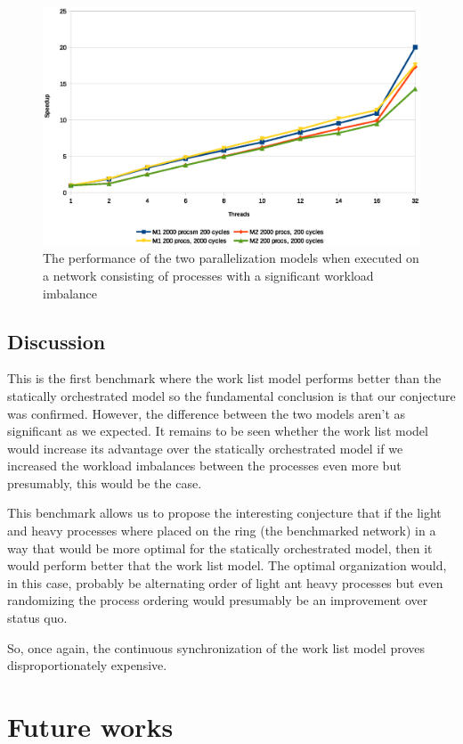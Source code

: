 \begin{figure}
\centering
\includegraphics[width=\textwidth]{graphs/uneven}
\caption[Benchmark of uneven workloads]{The performance of the two
  parallelization models when executed on a network consisting of
  processes with a significant workload imbalance}
\label{fig:uneven}
\end{figure}

\subsection{Discussion}
This is the first benchmark where the work list model performs better
than the statically orchestrated model so the fundamental conclusion
is that our conjecture was confirmed. However, the difference between
the two models aren't as significant as we expected. It remains to be
seen whether the work list model would increase its advantage over the
statically orchestrated model if we increased the workload imbalances
between the processes even more but presumably, this would be the
case.

This benchmark allows us to propose the interesting conjecture that if
the light and heavy processes where placed on the ring (the benchmarked
network) in a way that would be more optimal for the statically
orchestrated model, then it would perform better that the
work list model. The optimal organization would, in this case,
probably be alternating order of light ant heavy processes but even
randomizing the process ordering would presumably be an improvement
over status quo.

So, once again, the continuous synchronization of the work list model
proves disproportionately expensive.

\section{Future works}

